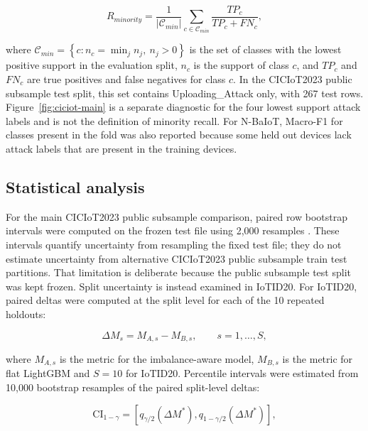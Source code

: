\documentclass[fleqn,10pt]{wlscirep}
\begin{document}
\begin{equation}
R_{minority} =
\frac{1}{|\mathcal{C}_{min}|}
\sum_{c \in \mathcal{C}_{min}}
\frac{TP_c}{TP_c + FN_c},
\label{eq:minority}
\end{equation}

where $\mathcal{C}_{min}=\left\{c:n_c=\min_j n_j,\ n_j>0\right\}$ is the set of classes with the lowest positive support in the evaluation split, $n_c$ is the support of class $c$, and $TP_c$ and $FN_c$ are true positives and false negatives for class $c$. In the CICIoT2023 public subsample test split, this set contains Uploading\_Attack only, with 267 test rows. Figure~\ref{fig:ciciot-main} is a separate diagnostic for the four lowest support attack labels and is not the definition of minority recall. For N-BaIoT, Macro-F1 for classes present in the fold was also reported because some held out devices lack attack labels that are present in the training devices.

\subsection*{Statistical analysis}

For the main CICIoT2023 public subsample comparison, paired row bootstrap intervals were computed on the frozen test file using 2,000 resamples \cite{efron1979bootstrap,efron1987bca}. These intervals quantify uncertainty from resampling the fixed test file; they do not estimate uncertainty from alternative CICIoT2023 public subsample train test partitions. That limitation is deliberate because the public subsample test split was kept frozen. Split uncertainty is instead examined in IoTID20. For IoTID20, paired deltas were computed at the split level for each of the 10 repeated holdouts:

\begin{equation}
\Delta M_s = M_{A,s} - M_{B,s}, \qquad s=1,\ldots,S,
\label{eq:splitdelta}
\end{equation}

where $M_{A,s}$ is the metric for the imbalance-aware model, $M_{B,s}$ is the metric for flat LightGBM and $S=10$ for IoTID20. Percentile intervals were estimated from 10,000 bootstrap resamples of the paired split-level deltas:

\begin{equation}
\mathrm{CI}_{1-\gamma} =
\left[
q_{\gamma/2}\left(\Delta M^*\right),
q_{1-\gamma/2}\left(\Delta M^*\right)
\right],
\label{eq:bootstrap}
\end{equation}
\end{document}
